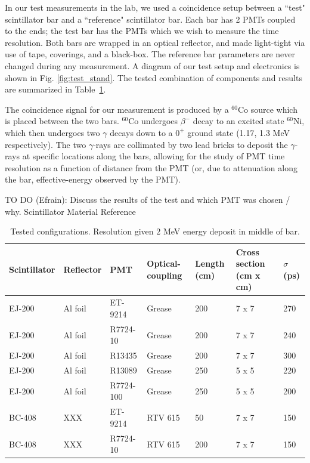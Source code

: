 \documentclass[3p,final,twocolumn]{elsarticle}
\begin{document}
In our test measurements in  the lab, we used a coincidence setup between a ``test" scintillator bar and a ``reference" scintillator bar. Each bar has 2 PMTs 
coupled to the ends; the test bar has the PMTs which we wish to measure the time resolution. Both bars are wrapped in an optical reflector, and made light-tight 
via use of tape, coverings, and a black-box. The reference bar parameters are never changed during any measurement. A diagram of our test setup and electronics is shown in Fig. \ref{fig:test_stand}. The tested combination of components and results are summarized in Table~\ref{tab:tests}. 

The coincidence signal for our measurement is produced by a $^{60}$Co source which is placed between the two bars. $^{60}$Co undergoes $\beta^-$ decay to an excited state $^{60}$Ni, which then undergoes 
two $\gamma$ decays down to a $0^+$ ground state (1.17, 1.3 \si{\mega\electronvolt} respectively). The two $\gamma$-rays are collimated by two lead bricks to deposit the $\gamma$-rays at specific locations along the bars, allowing for the 
study of PMT time resolution as a function of distance from the PMT (or, due to attenuation along the bar, effective-energy observed by the PMT).

{\color{red}TO DO (Efrain): Discuss the results of the test and which PMT was chosen / why.}
Scintillator Material Reference \cite{scint-mat-ref}


\begin{table}[t!]
	\caption{Tested configurations. Resolution given $2$ \si{\mega\electronvolt} energy deposit in middle of bar.}
	\begin{tabular}{  m{5em} | m{4em} | m{5em} | m{4em} | m{3em} |  m{5.7em} | m{3em} }
		\hline
			Scintillator & Reflector & PMT & Optical-coupling & Length (cm) & Cross section (\si{\centi\meter} x \si{\centi\meter}) & $\sigma$ (\si{\pico\second})\\
		\hline
		\hline
			EJ-200 & Al foil & ET-9214 & Grease & 200 & 7 x 7 & 270			\\
		
			EJ-200 & Al foil & R7724-10 & Grease & 200 & 7 x 7 & 240		\\
			EJ-200 & Al foil & R13435 & Grease & 200 & 7 x 7 & 300 			\\
		
			EJ-200 & Al foil & R13089 & Grease & 250 & 5 x 5  & 220			\\
			EJ-200 & Al foil & R7724-100 & Grease & 250 & 5 x 5 & 200 		\\
			
			BC-408 & XXX & ET-9214 & RTV 615 &50 & 7 x 7 & 150				\\
			BC-408 & XXX & R7724-10 & RTV 615 & 200 & 7 x 7 & 150			\\
		\hline
	\end{tabular}
	\label{tab:tests}
\end{table}
\end{document}
